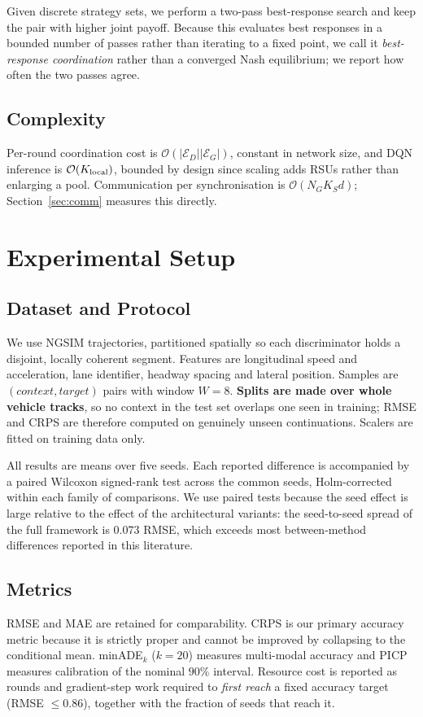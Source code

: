 \documentclass[journal]{IEEEtran}
\begin{document}
Given discrete strategy sets, we perform a two-pass best-response search and
keep the pair with higher joint payoff. Because this evaluates best responses in
a bounded number of passes rather than iterating to a fixed point, we call it
\emph{best-response coordination} rather than a converged Nash equilibrium; we
report how often the two passes agree.

\subsection{Complexity}
Per-round coordination cost is $\mathcal{O}(|\mathcal{E}_D||\mathcal{E}_G|)$,
constant in network size, and DQN inference is $\mathcal{O}(K_{\rm local})$,
bounded by design since scaling adds RSUs rather than enlarging a pool.
Communication per synchronisation is $\mathcal{O}(N_G K_S d)$;
Section~\ref{sec:comm} measures this directly.

\section{Experimental Setup}
\label{sec:setup}

\subsection{Dataset and Protocol}
We use NGSIM trajectories, partitioned spatially so each discriminator holds a
disjoint, locally coherent segment. Features are longitudinal speed and
acceleration, lane identifier, headway spacing and lateral position. Samples are
$(context,target)$ pairs with window $W=8$. \textbf{Splits are made over whole
vehicle tracks}, so no context in the test set overlaps one seen in training;
RMSE and CRPS are therefore computed on genuinely unseen continuations. Scalers
are fitted on training data only.

All results are means over five seeds. Each reported difference is accompanied
by a paired Wilcoxon signed-rank test across the common seeds, Holm-corrected
within each family of comparisons. We use paired tests because the seed effect
is large relative to the effect of the architectural variants: the seed-to-seed
spread of the full framework is $0.073$ RMSE, which exceeds most between-method
differences reported in this literature.

\subsection{Metrics}
RMSE and MAE are retained for comparability. CRPS is our primary accuracy metric
because it is strictly proper and cannot be improved by collapsing to the
conditional mean. minADE$_k$ ($k=20$) measures multi-modal accuracy and PICP
measures calibration of the nominal $90\%$ interval. Resource cost is reported
as rounds and gradient-step work required to \emph{first reach} a fixed accuracy
target (RMSE $\leq 0.86$), together with the fraction of seeds that reach it.
\end{document}
